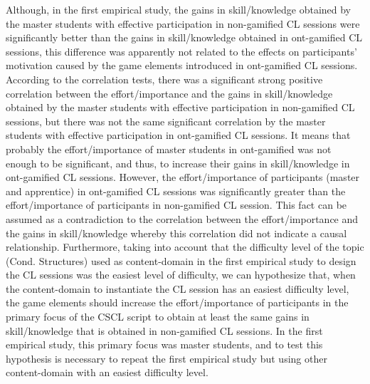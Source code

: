Although, in the first empirical study, the gains in skill/knowledge obtained by the master students with effective participation in non-gamified CL sessions were significantly better than the gains in skill/knowledge obtained in ont-gamified CL sessions, this difference was apparently not related to the effects on participants' motivation caused by the game elements introduced in ont-gamified CL sessions.
According to the correlation tests, there was a significant strong positive correlation between the effort/importance and the gains in skill/knowledge obtained by the master students with effective participation in non-gamified CL sessions, but there was not the same significant correlation by the master students with effective participation in ont-gamified CL sessions.
It means that probably the effort/importance of master students in ont-gamified was not enough to be significant, and thus, to increase their gains in skill/knowledge in ont-gamified CL sessions.
However, the effort/importance of participants (master and apprentice) in ont-gamified CL sessions was significantly greater than the effort/importance of participants in non-gamified CL session.
This fact can be assumed as a contradiction to the correlation between the effort/importance and the gains in skill/knowledge whereby this correlation did not indicate a causal relationship.
Furthermore, taking into account that the difficulty level of the topic (Cond. Structures) used as content-domain in the first empirical study to design the CL sessions was the easiest level of difficulty, we can hypothesize that, when the content-domain to instantiate the CL session has an easiest difficulty level, the game elements should increase the effort/importance of participants in the primary focus of the CSCL script to obtain at least the same gains in skill/knowledge that is obtained in non-gamified CL sessions.
In the first empirical study, this primary focus was master students, and to test this hypothesis is necessary to repeat the first empirical study but using other content-domain with an easiest difficulty level.

